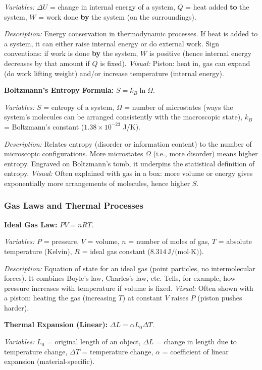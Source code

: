 \documentclass{article}
\begin{document}
\textit{Variables:} $\Delta U$ = change in internal energy of a system, $Q$ = heat added \textbf{to} the system, $W$ = work done \textbf{by} the system (on the surroundings).

\textit{Description:} Energy conservation in thermodynamic processes. If heat is added to a system, it can either raise internal energy or do external work. Sign conventions: if work is done \textbf{by} the system, $W$ is positive (hence internal energy decreases by that amount if $Q$ is fixed). \textit{Visual:} Piston: heat in, gas can expand (do work lifting weight) and/or increase temperature (internal energy).

\textbf{Boltzmann’s Entropy Formula:} $S = k_B \ln \Omega$.

\textit{Variables:} $S$ = entropy of a system, $\Omega$ = number of microstates (ways the system’s molecules can be arranged consistently with the macroscopic state), $k_B$ = Boltzmann’s constant ($1.38\times10^{-23}$ J/K).

\textit{Description:} Relates entropy (disorder or information content) to the number of microscopic configurations. More microstates $\Omega$ (i.e., more disorder) means higher entropy. Engraved on Boltzmann’s tomb, it underpins the statistical definition of entropy. \textit{Visual:} Often explained with gas in a box: more volume or energy gives exponentially more arrangements of molecules, hence higher $S$.

\subsubsection*{Gas Laws and Thermal Processes}

\textbf{Ideal Gas Law:} $P V = n R T$.

\textit{Variables:} $P$ = pressure, $V$ = volume, $n$ = number of moles of gas, $T$ = absolute temperature (Kelvin), $R$ = ideal gas constant ($8.314\,\text{J/(mol·K)}$).

\textit{Description:} Equation of state for an ideal gas (point particles, no intermolecular forces). It combines Boyle’s law, Charles’s law, etc. Tells, for example, how pressure increases with temperature if volume is fixed. \textit{Visual:} Often shown with a piston: heating the gas (increasing $T$) at constant $V$ raises $P$ (piston pushes harder).

\textbf{Thermal Expansion (Linear):} $\Delta L = \alpha L_0 \Delta T$.

\textit{Variables:} $L_0$ = original length of an object, $\Delta L$ = change in length due to temperature change, $\Delta T$ = temperature change, $\alpha$ = coefficient of linear expansion (material-specific).
\end{document}
